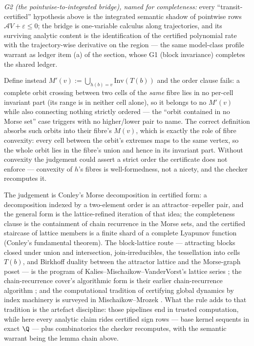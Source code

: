 \begin{bremark}
\emph{G2 (the pointwise-to-integrated bridge), named for
completeness:} every ``transit-certified'' hypothesis above is the
integrated semantic shadow of pointwise rows
$\mathcal{A}V + \varepsilon \leq 0$; the bridge is one-variable
calculus along trajectories, and its surviving analytic content is
the identification of the certified polynomial rate with the
trajectory-wise derivative on the region --- the same model-class
profile warrant as ledger item (a) of the 
section, whose G1 (block invariance) completes the shared ledger.
\end{bremark}

\begin{bremark}\label{rem:qmd-mv}
Define instead $M'(v) := \bigcup_{h(b) = v} \mathrm{Inv}(T(b))$ and
the order clause fails: a complete orbit crossing between two cells of
the \emph{same} fibre lies in no per-cell invariant part (its range is
in neither cell alone), so it belongs to no $M'(v)$ while also
connecting nothing strictly ordered --- the ``orbit contained in no
Morse set'' case triggers with no higher/lower pair to name. The
correct definition absorbs such orbits into their fibre's $M(v)$,
which is exactly the role of fibre convexity: every cell between the
orbit's extremes maps to the same vertex, so the whole orbit lies in
the fibre's union and hence in its invariant part. Without convexity
the judgement could assert a strict order the certificate does not
enforce --- convexity of $h$'s fibres is well-formedness, not a
nicety, and the checker recomputes it.
\end{bremark}

\begin{bremark}
The judgement is Conley's Morse decomposition \cite{conley1978} in
certified form: a decomposition indexed by a two-element order is an
attractor--repeller pair, and the general form is the lattice-refined
iteration of that idea; the completeness clause is the containment of
chain recurrence in the Morse sets, and the certified staircase of
lattice members is a finite shard of a complete Lyapunov function
(Conley's fundamental theorem). The block-lattice route --- attracting
blocks closed under union and intersection, join-irreducibles, the
tessellation into cells $T(b)$, and Birkhoff duality
\cite{birkhoff1937} between the attractor lattice and the Morse-graph
poset --- is the program of Kalies--Mischaikow--VanderVorst's lattice
series \cite{kmv2016,kmv2022}; the chain-recurrence cover's
algorithmic form is their earlier chain-recurrence algorithm
\cite{kmv2005}; and the computational tradition of certifying global
dynamics by index machinery is surveyed in Mischaikow--Mrozek
\cite{mischaikowmrozek2002}. What the rule adds to that tradition is
the artefact discipline: those pipelines end in trusted computation,
while here every analytic claim rides certified sign rows --- base
kernel sequents in exact $\Q$ --- plus combinatorics the checker
recomputes, with the semantic warrant being the lemma chain above.
\end{bremark}

